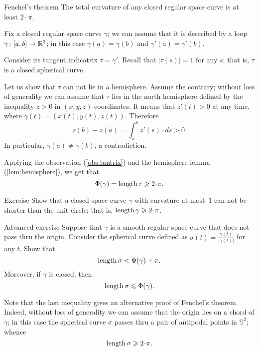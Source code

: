 \begin{thm}{Fenchel's theorem}\label{thm:fenchel}
The total curvature of any closed regular space curve is at least $2\cdot\pi$.
\end{thm}

Fix a closed regular space curve $\gamma$;
we can assume that it is described by a loop $\gamma\colon[a,b]\to \mathbb{R}^3$;
in this case $\gamma(a)=\gamma(b)$ and $\gamma'(a)=\gamma'(b)$.

Consider its tangent indicatrix $\tau=\gamma'$.
Recall that $|\tau(s)|=1$ for any $s$; that is, $\tau$ is a closed spherical curve.

Let us show that $\tau$ can not lie in a hemisphere.
Assume the contrary; without loss of generality we can assume that $\tau$ lies in the north hemisphere defined by the inequality $z>0$ in $(x,y,z)$-coordinates.
It means that $z'(t)>0$ at any time, where $\gamma(t)=(x(t), y(t), z(t))$.
Therefore 
\[z(b)-z(a)=\int_a^bz'(s)\cdot ds>0.\]
In particular, $\gamma(a)\ne \gamma(b)$, a contradiction.

Applying the observation (\ref{obs:tantrix}) and the hemisphere lemma (\ref{lem:hemisphere}), we get that 
\[\tc\gamma=\length \tau\ge2\cdot\pi.\]
\qedsf

\begin{thm}{Exercise}\label{ex:length>=2pi}
Show that a closed space curve $\gamma$ with curvature at most~$1$ can not be shorter than the unit circle;
that is, $\length\gamma\ge 2\cdot \pi$.
\end{thm}


\begin{thm}{Advanced exercise}
Suppose that $\gamma$ is a smooth regular space curve that does not pass thru the origin.
Consider the spherical curve defined as $\sigma(t)=\frac{\gamma(t)}{|\gamma(t)|}$ for any $t$.
Show that 
\[\mathop{\rm length}\nolimits \sigma< \Phi({\gamma})+\pi.\]
Moreover, if $\gamma$ is closed, then
\[\mathop{\rm length}\nolimits \sigma\leqslant \Phi({\gamma}).\]
\end{thm}



Note that the last inequality gives an alternative proof of Fenchel's theorem.
Indeed, without loss of generality we can assume that the origin lies on a chord of $\gamma$;
in this case the spherical curve $\sigma$ passes thru a pair of antipodal points in $\mathbb{S}^2$;
whence 
\[\length\sigma\ge 2\cdot\pi.\]



